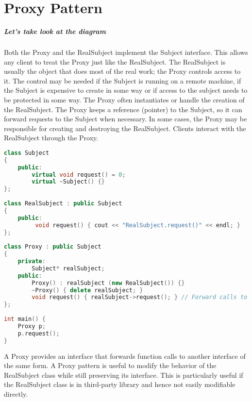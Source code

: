 \documentclass{book}
\begin{document}
\chapter{Proxy Pattern}\label{ProxyPattern}

\paragraph{Let's take look at the diagram}

\begin{figure}[H]
\begin{floatrow}
\end{floatrow}
\end{figure}

    Both the Proxy and the RealSubject implement the Subject interface. This allows any client to treat the Proxy just like the RealSubject.
    The RealSubject is usually the object that does most of the real work; the Proxy controls access to it.
    The control may be needed if the Subject is running on a remote machine, if the Subject is expensive to create in some way or if access to the subject needs to be protected in some way.
    The Proxy often instantiates or handle the creation of the RealSubject.
    The Proxy keeps a reference (pointer) to the Subject, so it can forward requests to the Subject when necessary.
    In some cases, the Proxy may be responsible for creating and destroying the RealSubject. Clients interact with the RealSubject through the Proxy.

\begin{lstlisting}[caption={Proxy pattern exmaple 1}, language=C++]
class Subject 
{
    public:
        virtual void request() = 0;
        virtual ~Subject() {}
};
 
class RealSubject : public Subject 
{
    public:
         void request() { cout << "RealSubject.request()" << endl; }
};
 
class Proxy : public Subject 
{
    private:
        Subject* realSubject;
    public:
        Proxy() : realSubject (new RealSubject()) {}
        ~Proxy() { delete realSubject; }
        void request() { realSubject->request(); } // Forward calls to the RealSubject:
};
 
int main() {
    Proxy p;
    p.request();
}
\end{lstlisting}

A Proxy provides an interface that forwards function calls to another interface of the same form.
A Proxy pattern is useful to modify the behavior of the RealSubject class while still preserving its interface.
This is particularly useful if the RealSubject class is in third-party library and hence not easily modifiable directly.
\end{document}
